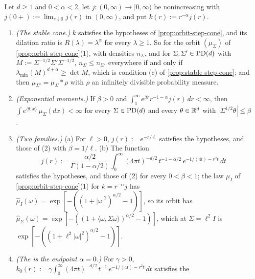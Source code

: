 \begin{proposition}
\label{prop:tempered-step-cone}
\leanok
Let $d \ge 1$ and $0 < \alpha < 2$, let $j : (0,\infty) \to [0,\infty)$ be nonincreasing with
$j(0{+}) := \lim_{r\downarrow0}j(r)$ in $(0,\infty)$, and put $k(r) := r^{-\alpha}j(r)$.
\begin{enumerate}
\item \emph{(The stable cone.)} $k$ satisfies the hypotheses of \ref{prop:orbit-step-cone}, and its
dilation ratio is $R(\lambda) = \lambda^\alpha$ for every $\lambda \ge 1$. So for the orbit
$(\mu_\Sigma)$ of \ref{prop:orbit-step-cone}(1), with \Levy{} densities $n_\Sigma$, and for
$\Sigma, \Sigma' \in \mathrm{PD}(d)$ with $M := \Sigma^{-1/2}\Sigma'\Sigma^{-1/2}$, $n_\Sigma \le n_{\Sigma'}$
everywhere if and only if $\lambda_{\min}(M)^{d+\alpha} \ge \det M$, which is condition (c) of
\ref{prop:stable-step-cone}; and then $\mu_{\Sigma'} = \mu_\Sigma * \rho$ with $\rho$ an infinitely
divisible probability measure.
\item \emph{(Exponential moments.)} If $\beta > 0$ and
$\int_1^\infty e^{\beta r}r^{-1-\alpha}j(r)\,dr < \infty$, then
$\int e^{\langle\theta,x\rangle}\,\mu_\Sigma(dx) < \infty$ for every $\Sigma \in \mathrm{PD}(d)$ and every
$\theta \in \mathbb{R}^d$ with $|\Sigma^{1/2}\theta| \le \beta$.
\item \emph{(Two families.)} (a) For $\ell > 0$, $j(r) := e^{-r/\ell}$ satisfies the hypotheses, and
those of (2) with $\beta = 1/\ell$. (b) The function
\[
  j(r) := \frac{\alpha/2}{\Gamma(1-\alpha/2)}\int_0^\infty(4\pi t)^{-d/2}\,t^{-1-\alpha/2}\,
  e^{-1/(4t) - r^2t}\,dt
\]
satisfies the hypotheses, and those of (2) for every $0 < \beta < 1$; the law $\mu_I$ of
\ref{prop:orbit-step-cone}(1) for $k = r^{-\alpha}j$ has
$\widehat\mu_I(\omega) = \exp[-((1 + |\omega|^2)^{\alpha/2} - 1)]$, so its orbit has
$\widehat\mu_\Sigma(\omega) = \exp[-((1 + \langle\omega,\Sigma\omega\rangle)^{\alpha/2} - 1)]$, which
at $\Sigma = \ell^2I$ is $\exp[-((1 + \ell^2|\omega|^2)^{\alpha/2} - 1)]$.
\item \emph{(The \Matern{} is the endpoint $\alpha = 0$.)} For $\gamma > 0$,
$k_0(r) := \gamma\int_0^\infty(4\pi t)^{-d/2}\,t^{-1}\,e^{-1/(4t) - r^2t}\,dt$ satisfies the

\end{enumerate}
\end{proposition}
